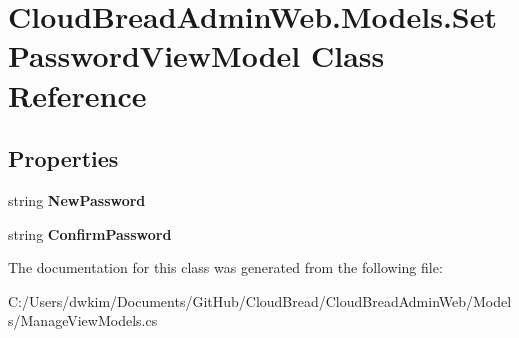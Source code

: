 \hypertarget{a00180}{}\section{Cloud\+Bread\+Admin\+Web.\+Models.\+Set\+Password\+View\+Model Class Reference}
\label{a00180}
\subsection*{Properties}
\begin{DoxyCompactItemize}
\item 
string {\bfseries New\+Password}\hypertarget{a00180_aeede5ee6b5e6a27233330f2994f405b5}{}\label{a00180_aeede5ee6b5e6a27233330f2994f405b5}

\item 
string {\bfseries Confirm\+Password}\hypertarget{a00180_ada1a448bd5c04747a344a8ae820d2757}{}\label{a00180_ada1a448bd5c04747a344a8ae820d2757}

\end{DoxyCompactItemize}


The documentation for this class was generated from the following file\+:\begin{DoxyCompactItemize}
\item 
C\+:/\+Users/dwkim/\+Documents/\+Git\+Hub/\+Cloud\+Bread/\+Cloud\+Bread\+Admin\+Web/\+Models/Manage\+View\+Models.\+cs\end{DoxyCompactItemize}

